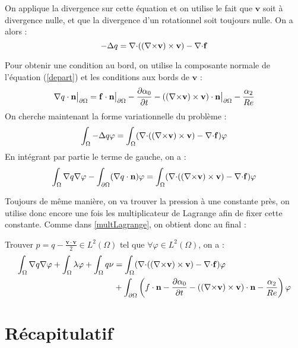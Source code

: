 On applique la divergence sur cette équation et on utilise le fait que $\mathbf{v}$ soit à divergence nulle, et que la divergence d'un rotationnel soit toujours nulle. On a alors :
\begin{equation*}
-{\Delta} q = {\nabla\cdot}(({\nabla\times} \mathbf{v})\times \mathbf{v}) - {\nabla\cdot} \mathbf{f}
\end{equation*}

Pour obtenir une condition au bord, on utilise la composante normale de l'équation (\ref{depart}) et les conditions aux bords de $\mathbf{v}$ :
\[ {\nabla} q\cdot \mathbf{n}{\big\rvert_{\partial\Omega}} =  \mathbf{f}\cdot \mathbf{n}{\big\rvert_{\partial\Omega}} - \frac{\partial\alpha_0}{\partial t} - (({\nabla\times} \mathbf{v})\times \mathbf{v})\cdot \mathbf{n}{\big\rvert_{\partial\Omega}} - \frac{\alpha_2}{Re} \]
On cherche maintenant la forme variationnelle du problème :
\[ \int_\Omega -{\Delta} q\varphi = \int_\Omega ({\nabla\cdot}(({\nabla\times} \mathbf{v})\times \mathbf{v}) -{\nabla\cdot} \mathbf{f})\varphi \]
En intégrant par partie le terme de gauche, on a :
\[ \int_\Omega {\nabla} q{\nabla}\varphi - \int_{\partial\Omega} ({\nabla} q\cdot \mathbf{n})\varphi = \int_\Omega ({\nabla\cdot}(({\nabla\times} \mathbf{v})\times \mathbf{v}) -{\nabla\cdot} \mathbf{f})\varphi \]

Toujours de même manière, on va trouver la pression à une constante près, on utilise donc encore une fois les multiplicateur de Lagrange afin de fixer cette constante. Comme dans \ref{multLagrange}, on obtient donc au final :
\begin{pb}\label{fvq}
Trouver $p=q-\frac{\mathbf{v}\cdot\mathbf{v}}{2} \in L^2(\Omega)$ tel que $\forall \varphi\in L^2(\Omega)$, on a :
\begin{align*}
\int_\Omega {\nabla} q{\nabla}\varphi + \int_\Omega \lambda\varphi + \int_\Omega q\nu &= \int_\Omega ({\nabla\cdot}(({\nabla\times} \mathbf{v})\times \mathbf{v}) -{\nabla\cdot} \mathbf{f})\varphi\\
&+ \int_{\partial\Omega} \left(f\cdot \mathbf{n} - \frac{\partial\alpha_0}{\partial t} - (({\nabla\times} \mathbf{v})\times \mathbf{v})\cdot \mathbf{n} - \frac{\alpha_2}{Re}\right)\varphi
\end{align*}\end{pb}

\chapter{Récapitulatif}

